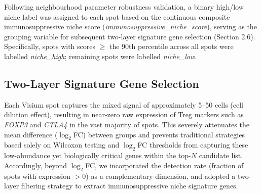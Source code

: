 \documentclass[12pt, a4paper]{article}
\begin{document}
Following neighbourhood parameter robustness validation, a binary high/low niche label was assigned to each spot based on the continuous composite immunosuppressive niche score (\textit{immunosuppressive\_niche\_score}), serving as the grouping variable for subsequent two-layer signature gene selection (Section 2.6). Specifically, spots with scores $\geq$ the 90th percentile across all spots were labelled \textit{niche\_high}; remaining spots were labelled \textit{niche\_low}.

\subsection{Two-Layer Signature Gene Selection}

Each Visium spot captures the mixed signal of approximately 5--50 cells (cell dilution effect), resulting in near-zero raw expression of Treg markers such as \textit{FOXP3} and \textit{CTLA4} in the vast majority of spots. This severely attenuates the mean difference ($\log_2$FC) between groups and prevents traditional strategies based solely on Wilcoxon testing and $\log_2$FC thresholds from capturing these low-abundance yet biologically critical genes within the top-$N$ candidate list. Accordingly, beyond $\log_2$FC, we incorporated the detection rate (fraction of spots with expression $> 0$) as a complementary dimension, and adopted a two-layer filtering strategy to extract immunosuppressive niche signature genes.
\end{document}
